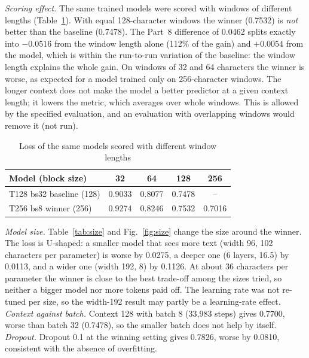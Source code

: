 \documentclass[10pt,twocolumn]{article}
\begin{document}
\emph{Scoring effect.} The same trained models were scored with windows of different lengths (Table~\ref{tab:win}). With equal 128-character windows the winner (0.7532) is \emph{not} better than the baseline (0.7478). The Part~8 difference of 0.0462 splits exactly into $-0.0516$ from the window length alone (112\% of the gain) and $+0.0054$ from the model, which is within the run-to-run variation of the baseline: the window length explains the whole gain. On windows of 32 and 64 characters the winner is worse, as expected for a model trained only on 256-character windows. The longer context does not make the model a better predictor at a given context length; it lowers the metric, which averages over whole windows. This is allowed by the specified evaluation, and an evaluation with overlapping windows would remove it (not run).

\begin{table}[t]\centering\caption{Loss of the same models scored with different window lengths}\label{tab:win}
\footnotesize\begin{tabular}{lcccc}\toprule
Model (block size) & 32 & 64 & 128 & 256\\\midrule
T128 bs32 baseline (128) & 0.9033 & 0.8077 & 0.7478 & --\\
T256 bs8 winner (256) & 0.9274 & 0.8246 & 0.7532 & 0.7016\\\bottomrule\end{tabular}\end{table}

\emph{Model size.} Table~\ref{tab:size} and Fig.~\ref{fig:size} change the size around the winner. The loss is U-shaped: a smaller model that sees more text (width 96, 102 characters per parameter) is worse by 0.0275, a deeper one (6 layers, 16.5) by 0.0113, and a wider one (width 192, 8) by 0.1126. At about 36 characters per parameter the winner is close to the best trade-off among the sizes tried, so neither a bigger model nor more tokens paid off. The learning rate was not re-tuned per size, so the width-192 result may partly be a learning-rate effect. \emph{Context against batch.} Context 128 with batch 8 (33,983 steps) gives 0.7700, worse than batch 32 (0.7478), so the smaller batch does not help by itself. \emph{Dropout.} Dropout 0.1 at the winning setting gives 0.7826, worse by 0.0810, consistent with the absence of overfitting.
\end{document}
